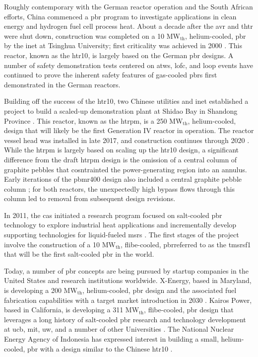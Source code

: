 Roughly contemporary with the German reactor operation and the South African efforts, China commenced a \gls{pbr} program to investigate applications in clean energy and hydrogen fuel cell process heat. About a decade after the \gls{avr} and \gls{thtr} were shut down, construction was completed on a 10 MW$_\text{th}$, helium-cooled, \gls{pbr} by the \gls{inet} at Tsinghua University; first criticality was achieved in 2000 \cite{gao,chen_htr,xu_htr}. This reactor, known as the \gls{htr10}, is largely based on the German \gls{pbr} designs. A number of safety demonstration tests centered on \gls{atws}, \gls{lofc}, and \gls{loop} events have continued to prove the inherent safety features of gas-cooled \glspl{pbr} first demonstrated in the German reactors.

Building off the success of the \gls{htr10}, two Chinese utilities and \gls{inet} established a project to build a scaled-up demonstration plant at Shidao Bay in Shandong Province \cite{xu_htr,htrpm,htrpm_website}. This reactor, known as the \gls{htrpm}, is a 250 MW$_\text{th}$, helium-cooled, design that will likely be the first Generation IV reactor in operation. The reactor vessel head was installed in late 2017, and construction continues through 2020 \cite{htrpm_2020}. While the \gls{htrpm} is largely based on scaling up the \gls{htr10} design, a significant difference from the draft \gls{htrpm} design is the omission of a central column of graphite pebbles that cosntrainted the power-generating region into an annulus. Early iterations of the \gls{pbmr400} design also included a central graphite pebble column \cite{koster}; for both reactors, the unexpectedly high bypass flows through this column led to removal from subsequent design revisions.

In 2011, the \gls{cas} initiated a research program focused on salt-cooled \gls{pbr} technology to explore industrial heat applications and incrementally develop supporting technologies for liquid-fueled \glspl{msr} \cite{dai}. The first stages of the project involve the construction of a 10 MW$_\text{th}$, \gls{flibe}-cooled, \gls{pbr}referred to as the \gls{tmsrsf1} that will be the first salt-cooled \gls{pbr} in the world. 

Today, a number of \gls{pbr} concepts are being pursued by startup companies in the United States and research institutions worldwide. X-Energy, based in Maryland, is developing a 200 MW$_\text{th}$, helium-cooled, \gls{pbr} design and the associated fuel fabrication capabilities with a target market introduction in 2030 \cite{x_energy}. Kairos Power, based in California, is developing a 311 MW$_\text{th}$, \gls{flibe}-cooled, \gls{pbr} design that leverages a long history of salt-cooled \gls{pbr} research and technology development at \gls{ucb}, \gls{mit}, \gls{uw}, and a number of other Universities \cite{kairos}. The National Nuclear Energy Agency of Indonesia has expressed interest in building a small, helium-cooled, \gls{pbr} with a design similar to the Chinese \gls{htr10} \cite{liem}. 

